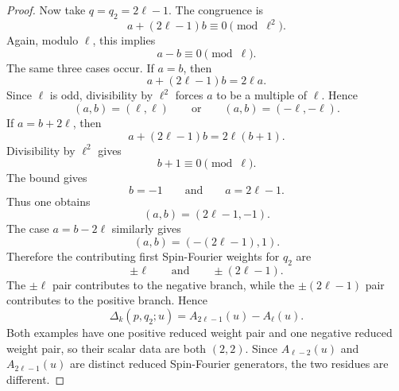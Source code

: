 \documentclass[10pt,a4paper]{amsart}
\begin{document}
\begin{proof}
Now take $q=q_2=2\ell-1$.  The congruence is
\begin{equation}
a+(2\ell-1)b\equiv0\pmod{\ell^2}.
\end{equation}
Again, modulo $\ell$, this implies
\begin{equation}
a-b\equiv0\pmod{\ell}.
\end{equation}
The same three cases occur.  If $a=b$, then
\begin{equation}
a+(2\ell-1)b=2\ell a.
\end{equation}
Since $\ell$ is odd, divisibility by $\ell^2$ forces $a$ to be a multiple of $\ell$.  Hence
\begin{equation}
(a,b)=(\ell,\ell)
\qquad\text{or}\qquad
(a,b)=(-\ell,-\ell).
\end{equation}
If $a=b+2\ell$, then
\begin{equation}
a+(2\ell-1)b=2\ell(b+1).
\end{equation}
Divisibility by $\ell^2$ gives
\begin{equation}
b+1\equiv0\pmod{\ell}.
\end{equation}
The bound gives
\begin{equation}
b=-1
\qquad\text{and}\qquad
a=2\ell-1.
\end{equation}
Thus one obtains
\begin{equation}
(a,b)=(2\ell-1,-1).
\end{equation}
The case $a=b-2\ell$ similarly gives
\begin{equation}
(a,b)=(-(2\ell-1),1).
\end{equation}
Therefore the contributing first Spin-Fourier weights for $q_2$ are
\begin{equation}
\pm\ell
\qquad\text{and}\qquad
\pm(2\ell-1).
\end{equation}
The $\pm\ell$ pair contributes to the negative branch, while the $\pm(2\ell-1)$ pair contributes to the positive branch.  Hence
\begin{equation}
\Delta_k(p,q_2;u)=A_{2\ell-1}(u)-A_{\ell}(u).
\end{equation}
Both examples have one positive reduced weight pair and one negative reduced weight pair, so their scalar data are both $(2,2)$.  Since $A_{\ell-2}(u)$ and $A_{2\ell-1}(u)$ are distinct reduced Spin-Fourier generators, the two residues are different.
\end{proof}
\end{document}
